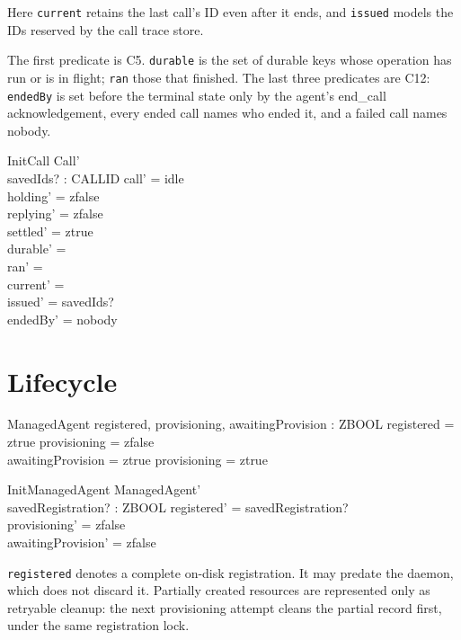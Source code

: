 \documentclass[a4paper,10pt,fleqn]{article}
\begin{document}
Here \texttt{current} retains the last call's ID even after it ends, and
\texttt{issued} models the IDs reserved by the call trace store.

The first predicate is C5. \texttt{durable} is the set of durable keys whose
operation has run or is in flight; \texttt{ran} those that finished. The
last three predicates are C12: \texttt{endedBy} is set before the terminal
state only by the agent's end\_call acknowledgement, every ended call names
who ended it, and a failed call names nobody.

\begin{schema}{InitCall}
  Call' \\
  savedIds? : \power CALLID
\where
  call' = idle \\
  holding' = zfalse \\
  replying' = zfalse \\
  settled' = ztrue \\
  durable' = \emptyset \\
  ran' = \emptyset \\
  current' = \emptyset \\
  issued' = savedIds? \\
  endedBy' = nobody
\end{schema}

\section{Lifecycle}

\begin{schema}{ManagedAgent}
  registered, provisioning, awaitingProvision : ZBOOL
\where
  registered = ztrue \implies provisioning = zfalse \\
  awaitingProvision = ztrue \implies provisioning = ztrue
\end{schema}

\begin{schema}{InitManagedAgent}
  ManagedAgent' \\
  savedRegistration? : ZBOOL
\where
  registered' = savedRegistration? \\
  provisioning' = zfalse \\
  awaitingProvision' = zfalse
\end{schema}

\texttt{registered} denotes a complete on-disk registration. It may
predate the daemon, which does not discard it. Partially created resources
are represented only as retryable cleanup: the next provisioning attempt
cleans the partial record first, under the same registration lock.
\end{document}
